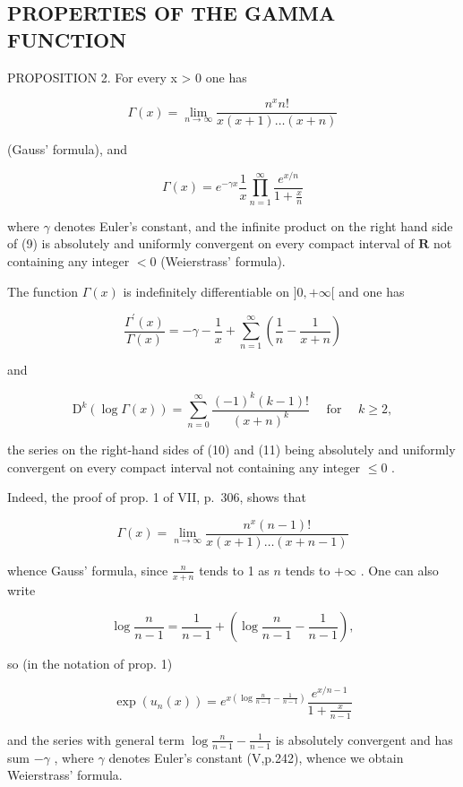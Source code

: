 \subsection{PROPERTIES OF THE GAMMA FUNCTION}

PROPOSITION 2. For every x \textgreater{} 0 one has

\[
\Gamma (x) = \lim _ {n \rightarrow \infty} \frac {n ^ {x} n !}{x (x + 1) \dots (x + n)}\tag{8}
\]

(Gauss' formula), and

\[
\Gamma (x) = e ^ {- \gamma x} \frac {1}{x} \prod_ {n = 1} ^ {\infty} \frac {e ^ {x / n}}{1 + \frac {x}{n}}\tag{9}
\]

where \(\gamma\) denotes Euler's constant, and the infinite product on the right hand side of (9) is absolutely and uniformly convergent on every compact interval of \(\mathbf{R}\) not containing any integer \(< 0\) (Weierstrass' formula).

The function \(\Gamma(x)\) is indefinitely differentiable on \(]0, +\infty[\) and one has

\[
{\frac {\Gamma^ {\prime} (x)}{\Gamma (x)}} = - \gamma - {\frac {1}{x}} + \sum_ {n = 1} ^ {\infty} \left({\frac {1}{n}} - {\frac {1}{x + n}}\right)\tag{10}
\]

and

\[
\mathrm{D} ^ {k} (\log \Gamma (x)) = \sum_ {n = 0} ^ {\infty} \frac {(- 1) ^ {k} (k - 1) !}{(x + n) ^ {k}} \quad \text { for } \quad k \geqslant 2,\tag{11}
\]

the series on the right-hand sides of (10) and (11) being absolutely and uniformly convergent on every compact interval not containing any integer \(\leqslant 0\) .

Indeed, the proof of prop. 1 of VII, p.~306, shows that

\[
\Gamma (x) = \lim _ {n \rightarrow \infty} \frac {n ^ {x} (n - 1) !}{x (x + 1) \dots (x + n - 1)}
\]

whence Gauss' formula, since \(\frac{n}{x + n}\) tends to 1 as \(n\) tends to \(+\infty\) . One can also write

\[
\log \frac {n}{n - 1} = \frac {1}{n - 1} + \left(\log \frac {n}{n - 1} - \frac {1}{n - 1}\right),
\]

so (in the notation of prop. 1)

\[
\exp (u _ {n} (x)) = e ^ {x \left(\log \frac {n}{n - 1} - \frac {1}{n - 1}\right)} \frac {e ^ {x / n - 1}}{1 + \frac {x}{n - 1}}
\]

and the series with general term \(\log \frac{n}{n - 1} -\frac{1}{n - 1}\) is absolutely convergent and has sum \(-\gamma\) , where \(\gamma\) denotes Euler's constant (V,p.242), whence we obtain Weierstrass' formula.

